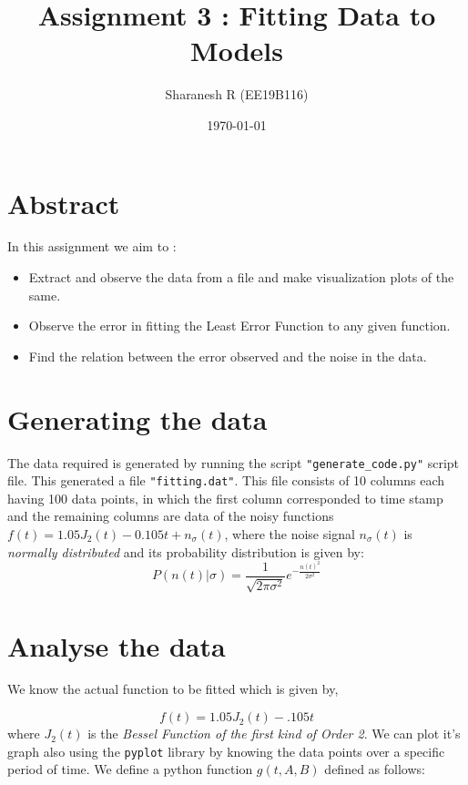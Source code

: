 \documentclass[11pt, a4paper]{article}
\title{Assignment 3 : Fitting Data to Models}
\author{Sharanesh R (EE19B116)}
\date{\today}
\begin{document}
		
		
\maketitle 
\section*{Abstract}

In this assignment we aim to :
\begin{itemize}
    \item Extract and observe the data from a file and make visualization plots of the same.
    \item Observe the error in fitting the Least Error Function to any given function.
    \item Find the relation between the error observed and the noise in the data.
\end{itemize}

\section{Generating the data}

 The data required is generated by running the script \texttt{"generate\_code.py"} script file. This generated a file \texttt{"fitting.dat"}. This file consists of 10 columns each having 100 data points, in which the first column corresponded to time stamp and the remaining columns are data of the noisy functions $f(t) = 1.05J_2(t)-0.105t+n_{\sigma}(t)$, where the noise signal $n_{\sigma}(t)$ is \textit{normally distributed} and its probability distribution is given by:
\begin{equation}
     P(n(t)|\sigma)=\frac{1}{\sqrt{2\pi\sigma^2}}e^{-\frac{n(t)^2}{2\sigma^2}} \label{eq:1}
\end{equation}

\section{Analyse the data}

We know the actual function to be fitted which is given by,

\begin{equation}\label{eq:2}
  f(t)=1.05J_2(t)-.105t
  \end{equation}
where $J_2(t)$ is the \textit{Bessel Function of the first kind of Order 2}. We can plot it’s graph also using the \texttt{pyplot} library by knowing the data points over a specific period of time. We define a python function $g(t, A, B)$ defined as follows:
  
\end{document}
